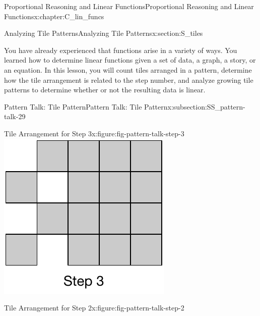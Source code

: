 \documentclass[oneside,10pt,]{book}
\numberwithin{equation}{chapter}
\begin{document}
\begin{chapterptx}{Proportional Reasoning and Linear Functions}{}{Proportional Reasoning and Linear Functions}{}{}{x:chapter:C_lin_funcs}
\begin{sectionptx}{Analyzing Tile Patterns}{}{Analyzing Tile Patterns}{}{}{x:section:S_tiles}
\begin{introduction}{}
You have already experienced that functions arise in a variety of ways. You learned how to determine linear functions given a set of data, a graph, a story, or an equation. In this lesson, you will count tiles arranged in a pattern, determine how the tile arrangement is related to the step number, and analyze growing tile patterns to determine whether or not the resulting data is linear.%
\end{introduction}%
%
%
\typeout{************************************************}
\typeout{************************************************}
%
\begin{subsectionptx}{Pattern Talk: Tile Pattern}{}{Pattern Talk: Tile Pattern}{}{}{x:subsection:SS_pattern-talk-29}
\begin{sidebyside}{2}{0}{0}{0}%
\begin{sbspanel}{0.5}%
\begin{figureptx}{Tile Arrangement for Step 3}{x:figure:fig-pattern-talk-step-3}{}%
\includegraphics[width=\linewidth]{external/pattern-talk-step-3.pdf}
\tcblower
\end{figureptx}%
\end{sbspanel}%
\begin{sbspanel}{0.5}%
\begin{figureptx}{Tile Arrangement for Step 2}{x:figure:fig-pattern-talk-step-2}{}%

\end{figureptx}
\end{sbspanel}
\end{sidebyside}
\end{subsectionptx}
\end{sectionptx}
\end{chapterptx}
\end{document}
